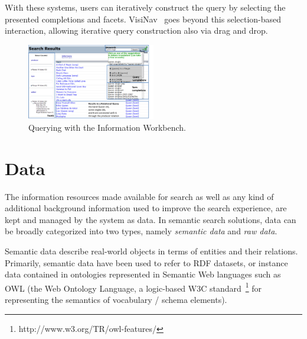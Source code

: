 With these systems, users can iteratively construct the query by selecting the presented completions and facets. VisiNav~\cite{DBLP:journals/ws/Harth10} goes beyond this selection-based interaction, allowing iterative query construction also via drag and drop. 	
	
\begin{figure}
	\centering
		\includegraphics[width=0.5\textwidth]{figs/screenshot_iwb}
	\caption{Querying with the Information Workbench.}
	\label{fig:screenshot_iwb}
	\vspace{-0.5cm}
\end{figure}




\section{Data}\label{sec:data}
The information resources made available for search as well as any kind of additional background information used to improve the search experience, are kept and managed by the system as data. In semantic search solutions, data can be broadly categorized into two types, namely \emph{semantic data} and \emph{raw data}. 

Semantic data describe real-world objects in terms of entities and their relations. Primarily, semantic data have been used to refer to RDF datasets, or instance data contained in ontologies represented in Semantic Web languages such as OWL (the Web Ontology Language, a logic-based W3C standard~\footnote{http://www.w3.org/TR/owl-features/} for representing the semantics of vocabulary / schema elements).

